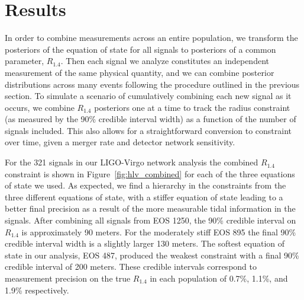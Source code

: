 \section{Results}\label{sec:eos_meas_results}

In order to combine measurements across an entire population, we transform the posteriors of the equation of state for all signals to posteriors of a common parameter, $R_{1.4}$. Then each signal we analyze constitutes an independent measurement of the same physical quantity, and we can combine posterior distributions across many events following the procedure outlined in the previous section. To simulate a scenario of cumulatively combining each new signal as it occurs, we combine $R_{1.4}$ posteriors one at a time to track the radius constraint (as measured by the 90\% credible interval width) as a function of the number of signals included. This also allows for a straightforward conversion to constraint over time, given a merger rate and detector network sensitivity.

For the 321 signals in our LIGO-Virgo network analysis the combined $R_{1.4}$ constraint is shown in Figure~\ref{fig:hlv_combined} for each of the three equations of state we used. As expected, we find a hierarchy in the constraints from the three different equations of state, with a stiffer equation of state leading to a better final precision as a result of the more measurable tidal information in the signals. After combining all signals from EOS 1250, the 90\% credible interval on $R_{1.4}$ is approximately 90 meters. For the moderately stiff EOS 895 the final 90\% credible interval width is a slightly larger 130 meters. The softest equation of state in our analysis, EOS 487, produced the weakest constraint with a final 90\% credible interval of 200 meters. These credible intervals correspond to measurement precision on the true $R_{1.4}$ in each population of 0.7\%, 1.1\%, and 1.9\% respectively. 

